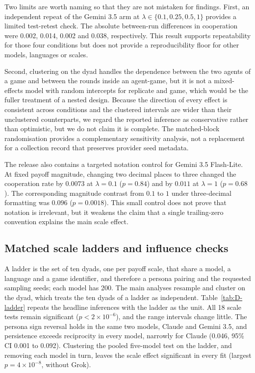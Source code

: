 \documentclass[11pt,a4paper]{article}
\newcommand{\lam}{\lambda}
\newcommand{\rev}[1]{{\color{red}#1}}
\newcommand{\rev}[1]{#1}
\begin{document}
Two limits are worth naming so that they are not mistaken for findings. First, an independent repeat of the Gemini 3.5 arm at $\lam \in \{0.1,0.25,0.5,1\}$ provides a limited test-retest check. The absolute between-run differences in cooperation were 0.002, 0.014, 0.002 and 0.038, respectively. This result supports repeatability for those four conditions but does not provide a reproducibility floor for other models, languages or scales.

Second, clustering on the dyad handles the dependence between the two agents of a game and between the rounds inside an agent-game, but it is not a mixed-effects model with random intercepts for replicate and game, which would be the fuller treatment of a nested design. Because the direction of every effect is consistent across conditions and the clustered intervals are wider than their unclustered counterparts, we regard the reported inference as conservative rather than optimistic, but we do not claim it is complete. The matched-block randomisation provides a complementary sensitivity analysis, not a replacement for a collection record that preserves provider seed metadata.

The release also contains a targeted notation control for Gemini 3.5 Flash-Lite. At fixed payoff magnitude, changing two decimal places to three changed the cooperation rate by $0.0073$ at $\lambda=0.1$ ($p=0.84$) and by $0.011$ at $\lambda=1$ ($p=0.68$). The corresponding magnitude contrast from $0.1$ to $1$ under three-decimal formatting was $0.096$ ($p=0.0018$). This small control does not prove that notation is irrelevant, but it weakens the claim that a single trailing-zero convention explains the main scale effect.


\subsection{Matched scale ladders and influence checks}\label{appendix:robust_ladders}

\rev{A ladder is the set of ten dyads, one per payoff scale, that share a model, a language and a game identifier, and therefore a persona pairing and the requested sampling seeds; each model has 200. The main analyses resample and cluster on the dyad, which treats the ten dyads of a ladder as independent. Table~\ref{tab:D-ladder} repeats the headline inferences with the ladder as the unit. All 18 scale tests remain significant ($p < 2\times10^{-6}$), and the range intervals change little. The persona sign reversal holds in the same two models, Claude and Gemini 3.5, and persistence exceeds reciprocity in every model, narrowly for Claude (0.046, 95\% CI 0.001 to 0.092). Clustering the pooled five-model test on the ladder, and removing each model in turn, leaves the scale effect significant in every fit (largest $p = 4\times10^{-8}$, without Grok).}
\end{document}
